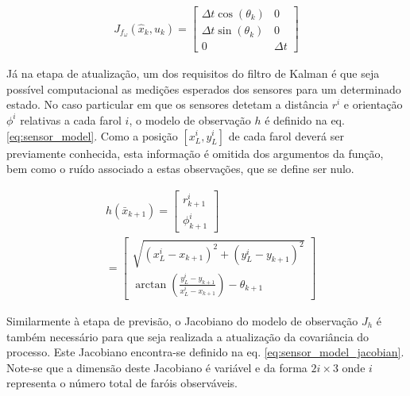 \documentclass[twocolumn]{article}
\begin{document}
\begin{equation}
    \begin{split}
        J_{f_\omega}(\hat{x}_k,u_k) = 
        \left[\begin{matrix}\Delta t \cos{\left(\theta_{k} \right)} & 0\\ \Delta t \sin{\left(\theta_{k} \right)} & 0\\0 & \Delta t\end{matrix}\right]
    \end{split}
    \label{eq:motion_model_jacobian_w}
\end{equation}

Já na etapa de atualização, um dos requisitos do filtro de Kalman é que seja possível computacional as medições esperados dos sensores para um determinado estado. No caso particular em que os sensores detetam a distância $r^i$ e orientação $\phi^i$ relativas a cada farol $i$, o modelo de observação $h$ é definido na eq. \ref{eq:sensor_model}. Como a posição $[x^i_L, y^i_L]$ de cada farol deverá ser previamente conhecida, esta informação é omitida dos argumentos da função, bem como o ruído associado a estas observações, que se define ser nulo.

\begin{equation}
    \begin{split}
        &h(\bar{x}_{k+1}) = \begin{bmatrix}
            r_{k+1}^i \\
            \phi_{k+1}^i
        \end{bmatrix} \\
        &= \begin{bmatrix}
            \sqrt{(x_L^i - x_{k+1})^2 + (y_L^i - y_{k+1})^2} \\
            \arctan(\frac{y_L^i - y_{k+1}}{x_L^i - x_{k+1}}) - \theta_{k+1}
        \end{bmatrix}
    \end{split}
    \label{eq:sensor_model}
\end{equation}

Similarmente à etapa de previsão, o Jacobiano do modelo de observação $J_h$ é também necessário para que seja realizada a atualização da covariância do processo. Este Jacobiano encontra-se definido na eq. \ref{eq:sensor_model_jacobian}. Note-se que a dimensão deste Jacobiano é variável e da forma $2i \times 3$ onde $i$ representa o número total de faróis observáveis.
\end{document}
